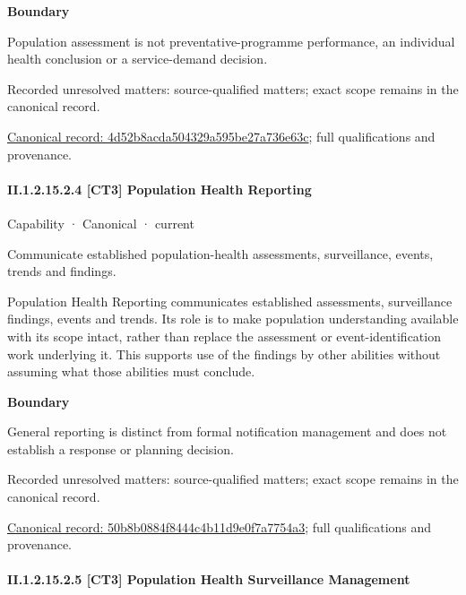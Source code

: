 \textbf{Boundary}



Population assessment is not preventative-programme performance, an individual health conclusion or a service-demand decision.


{\small Recorded unresolved matters: source-qualified matters; exact scope remains in the canonical record.}\par
{\footnotesize \href{../../../../../../../continuum/strategy/capability/4d52b8acda504329a595be27a736e63c.md}{Canonical record: 4d52b8acda504329a595be27a736e63c}; full qualifications and provenance.}\par
\paragraph*{II.1.2.15.2.4 [CT3] Population Health Reporting}
\label{navigation:II.1.2.15.2.4}

\label{element:50b8b0884f8444c4b11d9e0f7a7754a3}
{\small Capability · Canonical · current}\par

Communicate established population-health assessments, surveillance, events, trends and findings.



Population Health Reporting communicates established assessments, surveillance findings, events and trends. Its role is to make population understanding available with its scope intact, rather than replace the assessment or event-identification work underlying it. This supports use of the findings by other abilities without assuming what those abilities must conclude.



\textbf{Boundary}



General reporting is distinct from formal notification management and does not establish a response or planning decision.


{\small Recorded unresolved matters: source-qualified matters; exact scope remains in the canonical record.}\par
{\footnotesize \href{../../../../../../../continuum/strategy/capability/50b8b0884f8444c4b11d9e0f7a7754a3.md}{Canonical record: 50b8b0884f8444c4b11d9e0f7a7754a3}; full qualifications and provenance.}\par
\paragraph*{II.1.2.15.2.5 [CT3] Population Health Surveillance Management}
\label{navigation:II.1.2.15.2.5}


